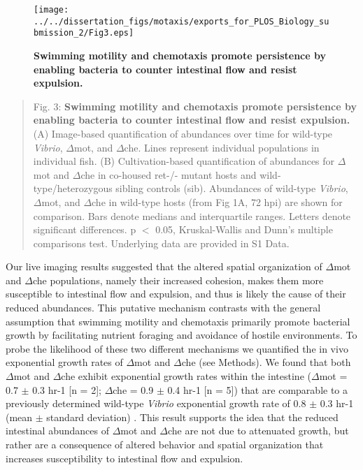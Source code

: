 \begin{figure}[h!]
	\centerline{
		\texttt{[image: ../../dissertation\_figs/motaxis/exports\_for\_PLOS\_Biology\_submission\_2/Fig3.eps]}}
	\caption{\textbf{Swimming motility and chemotaxis promote persistence by enabling bacteria to counter intestinal flow and resist expulsion.}}
\end{figure}

\begin{quote}
Fig. 3: \textbf{Swimming motility and chemotaxis promote persistence by enabling bacteria to counter intestinal flow and resist expulsion.}(A) Image-based quantification of abundances over time for wild-type \textit{Vibrio}, $\Delta$mot, and $\Delta$che. Lines represent individual populations in individual fish. (B) Cultivation-based quantification of abundances for $\Delta$mot and $\Delta$che in co-housed ret-/- mutant hosts and wild-type/heterozygous sibling controls (sib). Abundances of wild-type \textit{Vibrio}, $\Delta$mot, and $\Delta$che in wild-type hosts (from Fig 1A, 72 hpi) are shown for comparison. Bars denote medians and interquartile ranges. Letters denote significant differences. p $ < $ 0.05, Kruskal-Wallis and Dunn's multiple comparisons test. Underlying data are provided in S1 Data.
\end{quote}

Our live imaging results suggested that the altered spatial organization of $\Delta$mot and $\Delta$che populations, namely their increased cohesion, makes them more susceptible to intestinal flow and expulsion, and thus is likely the cause of their reduced abundances. This putative mechanism contrasts with the general assumption that swimming motility and chemotaxis primarily promote bacterial growth by facilitating nutrient foraging and avoidance of hostile environments. To probe the likelihood of these two different mechanisms we quantified the in vivo exponential growth rates of $\Delta$mot and $\Delta$che (see Methods). We found that both $\Delta$mot and $\Delta$che exhibit exponential growth rates within the intestine ($\Delta$mot = 0.7 $\pm$ 0.3 hr-1 [n = 2]; $\Delta$che = 0.9 $\pm$ 0.4 hr-1 [n = 5]) that are comparable to a previously determined wild-type \textit{Vibrio} exponential growth rate of 0.8 $\pm$ 0.3 hr-1 (mean $\pm$ standard deviation) \cite{wiles_host_2016}. This result supports the idea that the reduced intestinal abundances of $\Delta$mot and $\Delta$che are not due to attenuated growth, but rather are a consequence of altered behavior and spatial organization that increases susceptibility to intestinal flow and expulsion. 

